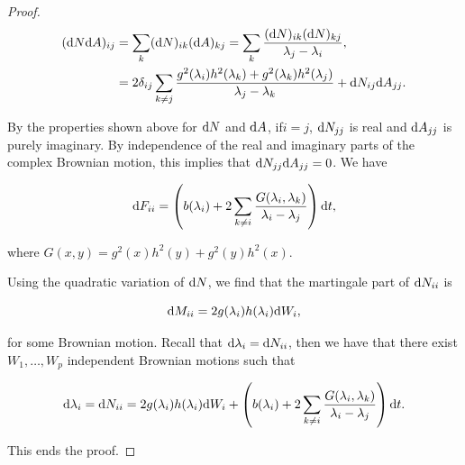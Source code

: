\begin{proof}
    \begin{align*}
        (\mathrm d N\mathrm d A)_{ij} &= \sum_{k} (\mathrm d N)_{ik}(\mathrm d A)_{kj} = \sum_k \frac{(\mathrm d N)_{ik}(\mathrm d N)_{kj}}{\lambda_j - \lambda_i}, \\
        &= 2\delta_{ij}\sum_{k\neq j} \frac{ g^2(\lambda_i)h^2(\lambda_k) + g^2(\lambda_k)h^2(\lambda_j)}{\lambda_j - \lambda_k} + \mathrm d N_{ij}\mathrm d A_{jj}.
    \end{align*}

    By the properties shown above for $\mathrm d N$ and $\mathrm d A$, if$i=j$, $\mathrm d N_{jj}$ is real and $\mathrm d A_{jj}$ is purely imaginary. By independence of the real and imaginary parts of the complex Brownian motion, this implies that $\mathrm d N_{jj}\mathrm d A_{jj}=0$. We have

    \begin{equation*}
        \mathrm d F_{ii} = \left(b(\lambda_i) + 2 \sum_{k\neq i} \frac{G(\lambda_i,\lambda_k)}{\lambda_i - \lambda_j}\right)\mathrm d t,
    \end{equation*}

    \noindent where $G(x,y)=g^2(x)h^2(y) + g^2(y)h^2(x)$.

    Using the quadratic variation of $\mathrm d N$, we find that the martingale part of $\mathrm d N_{ii}$ is 

    \begin{equation*}
        \mathrm d M_{ii} = 2g(\lambda_i)h(\lambda_i)\mathrm d W_i,
    \end{equation*}

    \noindent for some Brownian motion. Recall that $\mathrm d \lambda_i = \mathrm d N_{ii}$, then we have that there exist $W_1,\dots,W_p$ independent Brownian motions such that

    \begin{equation*}
        \mathrm d \lambda_i = \mathrm d N_{ii} = 2g(\lambda_i)h(\lambda_i)\mathrm d W_i + \left(b(\lambda_i) + 2 \sum_{k\neq i} \frac{G(\lambda_i,\lambda_k)}{\lambda_i - \lambda_j}\right)\mathrm d t.
    \end{equation*}

    This ends the proof.
\end{proof}


